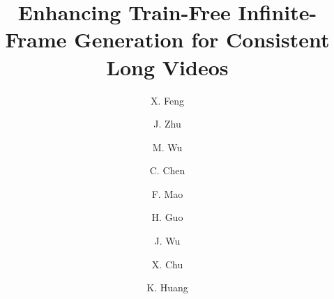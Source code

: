 \documentclass{llmxive}
\title{Enhancing Train-Free Infinite-Frame Generation for Consistent Long Videos}
\author{X. Feng \and J. Zhu \and M. Wu \and C. Chen \and F. Mao \and H. Guo \and J. Wu \and X. Chu \and K. Huang}
\providecommand{\eg}{e.g.,\xspace}
\begin{document}
\maketitle
\begin{abstract}




\end{abstract}
\end{document}
